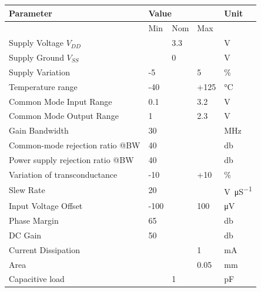 \documentclass{article}
\begin{document}
\begin{table}[ht!]
	\begin{tabular}{|l|l|l|l|l|}
		\rowcolor{LightCyan}\hline
		Parameter                        & \multicolumn{3}{l|}{Value}                & Unit\\ \hline
			                        & Min & Nom & Max              & \\ \hline
		Supply Voltage $V_{DD}$                 & & 3.3 & & \unit{\volt} \\ \hline
		Supply Ground   $V_{SS}$                 & & 0 & & \unit{\volt} \\ \hline
		Supply Variation                 & -5 & & 5     &   \unit{\percent}        \\ \hline
		Temperature range                & -40 & & +125 & \unit{\degreeCelsius}     \\ \hline
		Common Mode Input Range          & 0.1 & & 3.2 & \unit{\volt}        \\ \hline
		Common Mode Output Range         & 1  & & 2.3    &   \unit{\volt}    \\ \hline
		Gain Bandwidth                   & 30 & &          & \unit{\MHz}\\ \hline
		Common-mode rejection ratio @BW  & 40 & &          & \unit{\decibel}\\ \hline
		Power supply rejection ratio @BW & 40  & &        & \unit{\decibel}  \\ \hline
		Variation of transconductance    & -10 & & +10        & \unit{\percent}     \\ \hline
		Slew Rate                        & 20 & & &  \unit{\volt\per\micro\siemens}   \\ \hline
		Input Voltage Offset             & -100& & 100          &  \unit{\micro\volt}  \\ \hline
		Phase Margin                     & 65 & & &\unit{\decibel}         \\ \hline
		DC Gain                          & 50 & & &\unit{\decibel}       \\ \hline
		Current Dissipation              &  & & 1& \unit{\milli\ampere}         \\ \hline
		Area                             & & & 0.05 & \unit{\milli\metre}     \\ \hline
		Capacitive load                  & & 1 &  & \unit{\pico\farad}           \\   \hline
	\end{tabular}
\end{table}
\end{document}
